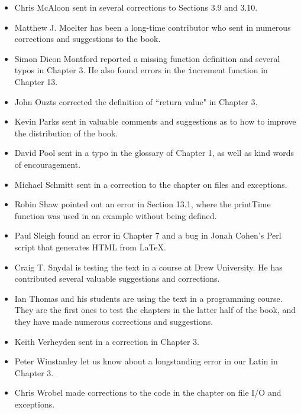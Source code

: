 \documentclass[
DIV=11,
fontsize=12,
twoside,
headinclude=false,
titlepage=firstiscover,
abstract=true,
headsepline=true,
footsepline=true,
chapterprefix=true, %
headings=big,
bibliography=totoc,%
captions=tableheading
]{scrbook}
\theoremstyle{definition}
\begin{document}
\begin{itemize}
\item Chris McAloon sent in several corrections to Sections 3.9 and
3.10.

\item Matthew J. Moelter has been a long-time contributor who sent
in numerous corrections and suggestions to the book.  

\item Simon Dicon Montford reported a missing function definition and
several typos in Chapter 3.  He also found errors in the {\texttt increment}
function in Chapter 13.

\item John Ouzts corrected the definition of ``return value"
in Chapter 3.

\item Kevin Parks sent in valuable comments and suggestions as to how
to improve the distribution of the book.

\item David Pool sent in a typo in the glossary of Chapter 1, as well
as kind words of encouragement.

\item Michael Schmitt sent in a correction to the chapter on files
and exceptions.

\item Robin Shaw pointed out an error in Section 13.1, where the
printTime function was used in an example without being defined.

\item Paul Sleigh found an error in Chapter 7 and a bug in Jonah Cohen's
Perl script that generates HTML from LaTeX.

\item Craig T. Snydal is testing the text in a course at Drew
University.  He has contributed several valuable suggestions and corrections.

\item Ian Thomas and his students are using the text in a programming
course.  They are the first ones to test the chapters in the latter half
of the book, and they have made numerous corrections and suggestions.

\item Keith Verheyden sent in a correction in Chapter 3.

\item Peter Winstanley let us know about a longstanding error in
our Latin in Chapter 3.

\item Chris Wrobel made corrections to the code in the chapter on
file I/O and exceptions. 


\end{itemize}
\end{document}
